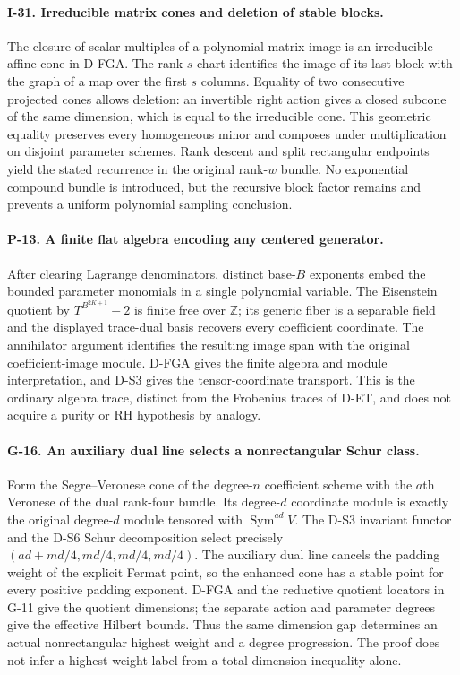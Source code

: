 \documentclass[11pt,a4paper]{article}
\theoremstyle{definition}\newtheorem{definition}{Definition}
\begin{document}
\paragraph{I-31. Irreducible matrix cones and deletion of stable blocks.}
The closure of scalar multiples of a polynomial matrix image is an
irreducible affine cone in D-FGA. The rank-$s$ chart identifies the
image of its last block with the graph of a map over the first $s$
columns. Equality of two consecutive projected cones allows deletion:
an invertible right action gives a closed subcone of the same dimension,
which is equal to the irreducible cone. This geometric equality
preserves every homogeneous minor and composes under multiplication
on disjoint parameter schemes. Rank descent and split rectangular
endpoints yield the stated recurrence in the original rank-$w$ bundle.
No exponential compound bundle is introduced, but the recursive block
factor remains and prevents a uniform polynomial sampling conclusion.

\paragraph{P-13. A finite flat algebra encoding any centered generator.}
After clearing Lagrange denominators, distinct base-$B$ exponents embed
the bounded parameter monomials in a single polynomial variable. The
Eisenstein quotient by $T^{B^{2K+1}}-2$ is finite free over
$\mathbb Z$; its generic fiber is a separable field and the displayed
trace-dual basis recovers every coefficient coordinate. The
annihilator argument identifies the resulting image span with the
original coefficient-image module. D-FGA gives the finite algebra and
module interpretation, and D-S3 gives the tensor-coordinate transport.
This is the ordinary algebra trace, distinct from the Frobenius traces
of D-ET, and does not acquire a purity or RH hypothesis by analogy.


\paragraph{G-16. An auxiliary dual line selects a nonrectangular Schur class.}
Form the Segre--Veronese cone of the degree-$n$ coefficient scheme with
the $a$th Veronese of the dual rank-four bundle. Its degree-$d$
coordinate module is exactly the original degree-$d$ module tensored
with $\operatorname{Sym}^{ad}V$. The D-S3 invariant functor and the
D-S6 Schur decomposition select precisely
$(ad+md/4,md/4,md/4,md/4)$. The auxiliary dual line cancels the padding
weight of the explicit Fermat point, so the enhanced cone has a stable
point for every positive padding exponent. D-FGA and the reductive
quotient locators in G-11 give the quotient dimensions; the separate
action and parameter degrees give the effective Hilbert bounds.
Thus the same dimension gap determines an actual nonrectangular
highest weight and a degree progression. The proof does not infer a
highest-weight label from a total dimension inequality alone.
\end{document}
